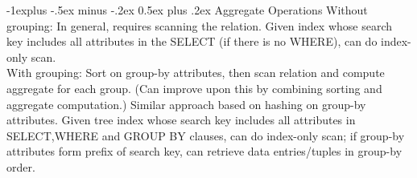 \documentclass[12pt,landscape]{article}
\makeatletter
\renewcommand{\subsection}{\@startsection{subsection}{2}{0mm}%
                                {-1explus -.5ex minus -.2ex}%
                                {0.5ex plus .2ex}%
                                {\normalfont\normalsize\bfseries}}
\makeatother
\begin{document}
\begin{multicols}{3}
\subsection{Aggregate Operations}
Without grouping: In general, requires scanning the relation. Given index whose search key includes all attributes in the SELECT (if there is no WHERE), can do index-only scan.\\
With grouping: Sort on group-by attributes, then scan relation and compute aggregate for each group. (Can improve upon this by combining sorting and aggregate computation.) Similar approach based on hashing on group-by attributes. Given tree index whose search key includes all attributes in SELECT,WHERE and GROUP BY clauses, can do index-only scan; if group-by attributes form prefix of search key, can retrieve data entries/tuples in group-by order.


\end{multicols}
\end{document}
